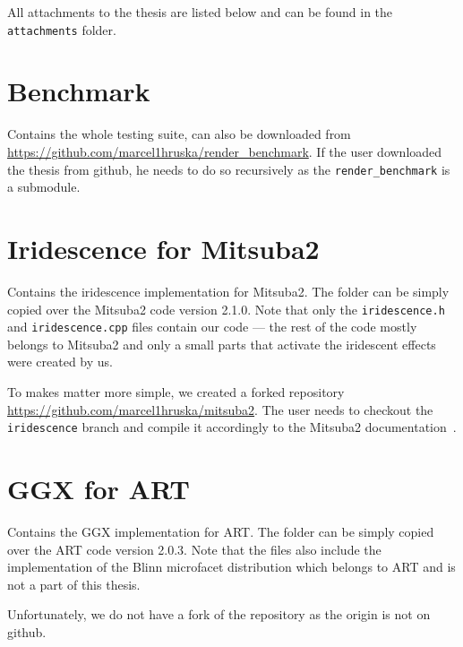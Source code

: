 \documentclass[12pt,a4paper]{report}
\let\openright=\clearpage
\begin{document}
All attachments to the thesis are listed below and can be found in the \texttt{attachments} folder. 

\section{Benchmark}
\label{sec:benchmark}

Contains the whole testing suite, can also be downloaded from \url{https://github.com/marcel1hruska/render_benchmark}. If the user downloaded the thesis from github, he needs to do so recursively as the \texttt{render\_benchmark} is a submodule.

\section{Iridescence for Mitsuba2}
\label{sec:mitsuba2_irid}

Contains the iridescence implementation for Mitsuba2. The folder can be simply copied over the Mitsuba2 code version 2.1.0. Note that only the \texttt{iridescence.h} and \texttt{iridescence.cpp} files contain our code --- the rest of the code mostly belongs to Mitsuba2 and only a small parts that activate the iridescent effects were created by us. 

To makes matter more simple, we created a forked repository \url{https://github.com/marcel1hruska/mitsuba2}. The user needs to checkout the \texttt{iridescence} branch and compile it accordingly to the Mitsuba2 documentation~\cite{mitsubaWeb}.

\section{GGX for ART}
\label{sec:ggx_art}

Contains the GGX implementation for ART. The folder can be simply copied over the ART code version 2.0.3. Note that the files also include the implementation of the Blinn microfacet distribution which belongs to ART and is not a part of this thesis. 

Unfortunately, we do not have a fork of the repository as the origin is not on github.

\openright
\end{document}
